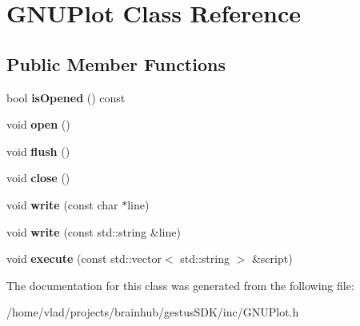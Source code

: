 \hypertarget{classGNUPlot}{}\section{G\+N\+U\+Plot Class Reference}
\label{classGNUPlot}
\subsection*{Public Member Functions}
\begin{DoxyCompactItemize}
\item 
\mbox{\label{classGNUPlot_a0564d60ca411f0d7fe794e34dcd68ecf}} 
bool {\bfseries is\+Opened} () const
\item 
\mbox{\label{classGNUPlot_a186ea2fed8f547252fd5db8e38660f1a}} 
void {\bfseries open} ()
\item 
\mbox{\label{classGNUPlot_ad6185af970ebace0913d8331c56eaebd}} 
void {\bfseries flush} ()
\item 
\mbox{\label{classGNUPlot_ab27c2ecae2068830d0e8c971d44bd676}} 
void {\bfseries close} ()
\item 
\mbox{\label{classGNUPlot_a2a229273dcf77c882931c8bd508cc909}} 
void {\bfseries write} (const char $\ast$line)
\item 
\mbox{\label{classGNUPlot_a42f713638f21a023e3dcebe013f431b4}} 
void {\bfseries write} (const std\+::string \&line)
\item 
\mbox{\label{classGNUPlot_a2774d4b9d63931b48aee47a1dbe55c96}} 
void {\bfseries execute} (const std\+::vector$<$ std\+::string $>$ \&script)
\end{DoxyCompactItemize}


The documentation for this class was generated from the following file\+:\begin{DoxyCompactItemize}
\item 
/home/vlad/projects/brainhub/gestus\+S\+D\+K/inc/G\+N\+U\+Plot.\+h\end{DoxyCompactItemize}
